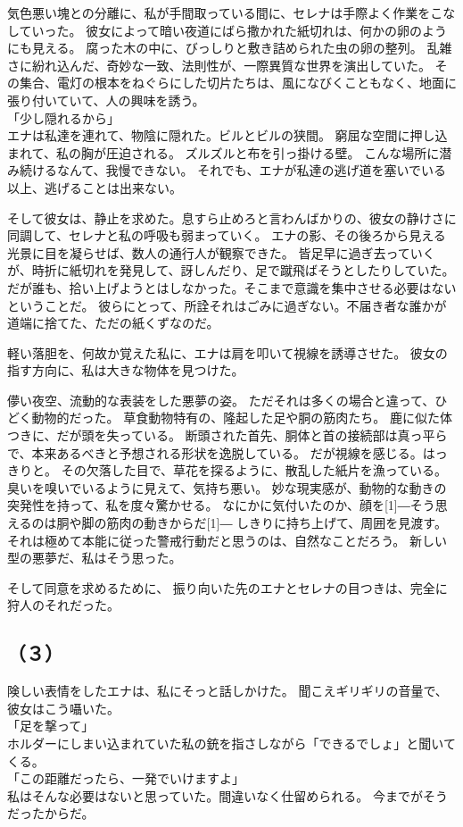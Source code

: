 \documentclass[../IHMain]{subfiles}
\begin{document}
気色悪い塊との分離に、私が手間取っている間に、セレナは手際よく作業をこなしていった。
彼女によって暗い夜道にばら撒かれた紙切れは、何かの卵のようにも見える。
腐った木の中に、びっしりと敷き詰められた虫の卵の整列。
乱雑さに紛れ込んだ、奇妙な一致、法則性が、一際異質な世界を演出していた。
その集合、電灯の根本をねぐらにした切片たちは、風になびくこともなく、地面に張り付いていて、人の興味を誘う。\\
「少し隠れるから」\\
エナは私達を連れて、物陰に隠れた。ビルとビルの狭間。
窮屈な空間に押し込まれて、私の胸が圧迫される。
ズルズルと布を引っ掛ける壁。
こんな場所に潜み続けるなんて、我慢できない。
それでも、エナが私達の逃げ道を塞いでいる以上、逃げることは出来ない。

そして彼女は、静止を求めた。息すら止めろと言わんばかりの、彼女の静けさに同調して、セレナと私の呼吸も弱まっていく。
エナの影、その後ろから見える光景に目を凝らせば、数人の通行人が観察できた。
皆足早に過ぎ去っていくが、時折に紙切れを発見して、訝しんだり、足で蹴飛ばそうとしたりしていた。
だが誰も、拾い上げようとはしなかった。そこまで意識を集中させる必要はないということだ。
彼らにとって、所詮それはごみに過ぎない。不届き者な誰かが道端に捨てた、ただの紙くずなのだ。

軽い落胆を、何故か覚えた私に、エナは肩を叩いて視線を誘導させた。
彼女の指す方向に、私は大きな物体を見つけた。

儚い夜空、流動的な表装をした悪夢の姿。
ただそれは多くの場合と違って、ひどく動物的だった。
草食動物特有の、隆起した足や胴の筋肉たち。
鹿に似た体つきに、だが頭を失っている。
断頭された首先、胴体と首の接続部は真っ平らで、本来あるべきと予想される形状を逸脱している。
だが視線を感じる。はっきりと。
その欠落した目で、草花を探るように、散乱した紙片を漁っている。
臭いを嗅いでいるように見えて、気持ち悪い。
妙な現実感が、動物的な動きの突発性を持って、私を度々驚かせる。
なにかに気付いたのか、顔を\scalebox{3}[1]{―}そう思えるのは胴や脚の筋肉の動きからだ\scalebox{3}[1]{―}
しきりに持ち上げて、周囲を見渡す。
それは極めて本能に従った警戒行動だと思うのは、自然なことだろう。
新しい型の悪夢だ、私はそう思った。

そして同意を求めるために、
振り向いた先のエナとセレナの目つきは、完全に狩人のそれだった。

\subsection*{（３）}
険しい表情をしたエナは、私にそっと話しかけた。
聞こえギリギリの音量で、彼女はこう囁いた。\\
「足を撃って」\\
ホルダーにしまい込まれていた私の銃を指さしながら「できるでしょ」と聞いてくる。\\
「この距離だったら、一発でいけますよ」\\
私はそんな必要はないと思っていた。間違いなく仕留められる。
今までがそうだったからだ。
\end{document}
